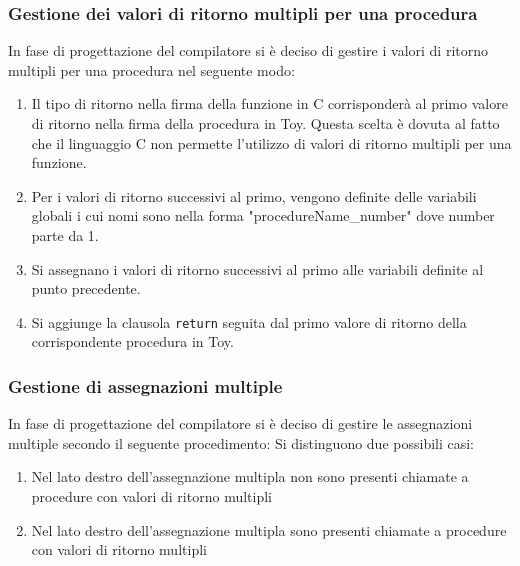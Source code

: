 \documentclass[a4paper,12pt]{article}
\begin{document}
	\subsubsection{Gestione dei valori di ritorno multipli per una procedura}\label{cg:procMultipleRet}
		In fase di progettazione del compilatore si è deciso di gestire i valori di ritorno multipli per una procedura nel seguente modo:
			\begin{enumerate}
				\item Il tipo di ritorno nella firma della funzione in C corrisponderà al primo valore di ritorno nella firma della procedura in Toy.
                        Questa scelta è dovuta al fatto che il linguaggio C non permette l'utilizzo di valori di ritorno multipli per una funzione.
				\item Per i valori di ritorno successivi al primo, vengono definite delle variabili globali
						i cui nomi sono nella forma "procedureName\_number" dove number parte da 1.
				\item Si assegnano i valori di ritorno successivi al primo alle variabili definite al punto precedente.
				\item Si aggiunge la clausola \texttt{return} seguita dal primo valore di ritorno della corrispondente procedura in Toy.
			\end{enumerate}

	\subsubsection{Gestione di assegnazioni multiple}

		In fase di progettazione del compilatore si è deciso di gestire le assegnazioni multiple secondo il seguente procedimento:
		Si distinguono due possibili casi:

		\begin{enumerate}
			\item Nel lato destro dell'assegnazione multipla non sono presenti chiamate a procedure con valori di ritorno multipli
			\item Nel lato destro dell'assegnazione multipla sono presenti chiamate a procedure con valori di ritorno multipli
		\end{enumerate}
		
\end{document}
